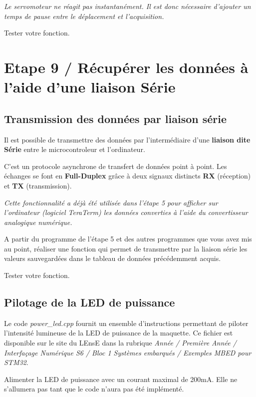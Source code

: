 \documentclass[a4paper,11pt,titlepage]{article} %
\begin{document}
\textit{Le servomoteur ne réagit pas instantanément. Il est donc nécessaire d'ajouter un temps de pause entre le déplacement et l'acquisition.}

\Manip Tester votre fonction.


\section{Etape 9 / Récupérer les données à l'aide d'une liaison Série}

\subsection{Transmission des données par liaison série}

Il est possible de transmettre des données par l'intermédiaire d'une \textbf{liaison dite Série} entre le microcontroleur et l'ordinateur.

C'est un protocole asynchrone de transfert de données point à point. Les échanges se font en \textbf{Full-Duplex} grâce à deux signaux distincts \textbf{RX} (réception) et \textbf{TX} (transmission).

\textit{Cette fonctionnalité a déjà été utilisée dans l'étape 5 pour afficher sur l'ordinateur (logiciel TeraTerm) les données converties à l'aide du convertisseur analogique numérique.}

\medskip

\Manip A partir du programme de l'étape 5 et des autres programmes que vous avez mis au point, réaliser une fonction qui permet de transmettre par la liaison série les valeurs sauvegardées dans le tableau de données précédemment acquis.

\Manip Tester votre fonction.

\subsection{Pilotage de la LED de puissance}

Le code \textsl{power\_led.cpp} fournit un ensemble d'instructions permettant de piloter l'intensité lumineuse de la LED de puissance de la maquette. Ce fichier est disponible sur le site du LEnsE dans la rubrique \textit{Année / Première Année / Interfaçage Numérique S6 / Bloc 1 Systèmes embarqués / Exemples MBED pour STM32}.

\Manip Alimenter la LED de puissance avec un courant maximal de 200mA. Elle ne s'allumera pas tant que le code n'aura pas été implémenté.
\end{document}
